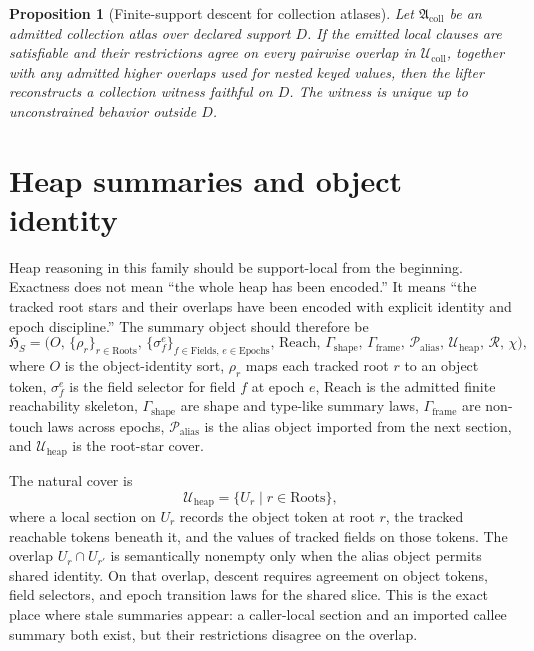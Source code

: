 \documentclass[11pt]{report}
\newtheorem{proposition}[definition]{Proposition}
\begin{document}
\begin{proposition}[Finite-support descent for collection atlases]
Let $\mathfrak{A}_{\mathrm{coll}}$ be an admitted collection atlas over declared support $D$. If the emitted local clauses are satisfiable and their restrictions agree on every pairwise overlap in $\mathcal{U}_{\mathrm{coll}}$, together with any admitted higher overlaps used for nested keyed values, then the lifter reconstructs a collection witness faithful on $D$. The witness is unique up to unconstrained behavior outside $D$.
\end{proposition}

\section{Heap summaries and object identity}
Heap reasoning in this family should be support-local from the beginning. Exactness does not mean ``the whole heap has been encoded.'' It means ``the tracked root stars and their overlaps have been encoded with explicit identity and epoch discipline.'' The summary object should therefore be
\[
\mathfrak{H}_{S}
=
\bigl(
O,\,
\{\rho_r\}_{r\in\mathrm{Roots}},\,
\{\sigma^{e}_{f}\}_{f\in\mathrm{Fields},\,e\in\mathrm{Epochs}},\,
\mathrm{Reach},\,
\Gamma_{\mathrm{shape}},\,
\Gamma_{\mathrm{frame}},\,
\mathcal{P}_{\mathrm{alias}},\,
\mathcal{U}_{\mathrm{heap}},\,
\mathcal{R},\,
\chi
\bigr),
\]
where $O$ is the object-identity sort, $\rho_r$ maps each tracked root $r$ to an object token, $\sigma_f^e$ is the field selector for field $f$ at epoch $e$, $\mathrm{Reach}$ is the admitted finite reachability skeleton, $\Gamma_{\mathrm{shape}}$ are shape and type-like summary laws, $\Gamma_{\mathrm{frame}}$ are non-touch laws across epochs, $\mathcal{P}_{\mathrm{alias}}$ is the alias object imported from the next section, and $\mathcal{U}_{\mathrm{heap}}$ is the root-star cover.

The natural cover is
\[
\mathcal{U}_{\mathrm{heap}}
=
\{U_r \mid r \in \mathrm{Roots}\},
\]
where a local section on $U_r$ records the object token at root $r$, the tracked reachable tokens beneath it, and the values of tracked fields on those tokens. The overlap $U_r\cap U_{r'}$ is semantically nonempty only when the alias object permits shared identity. On that overlap, descent requires agreement on object tokens, field selectors, and epoch transition laws for the shared slice. This is the exact place where stale summaries appear: a caller-local section and an imported callee summary both exist, but their restrictions disagree on the overlap.
\end{document}
